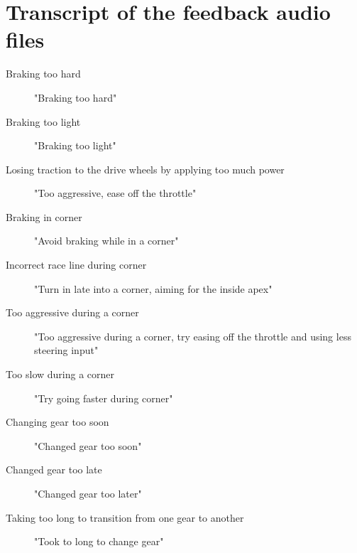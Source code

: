 \section{Transcript of the feedback audio files}

\begin{description}
	\item [Braking too hard] "Braking too hard"
	\item [Braking too light] "Braking too light"
	\item [Losing traction to the drive wheels by applying too much power] "Too aggressive, ease off the throttle"
	\item [Braking in corner] "Avoid braking while in a corner"
	\item [Incorrect race line during corner] "Turn in late into a corner, aiming for the inside apex"
	\item [Too aggressive during a corner] "Too aggressive during a corner, try easing off the throttle and using less steering input"
	\item [Too slow during a corner] "Try going faster during corner"
	\item [Changing gear too soon] "Changed gear too soon"
	\item [Changed gear too late] "Changed gear too later"
	\item [Taking too long to transition from one gear to another] "Took to long to change gear"
\end{description}